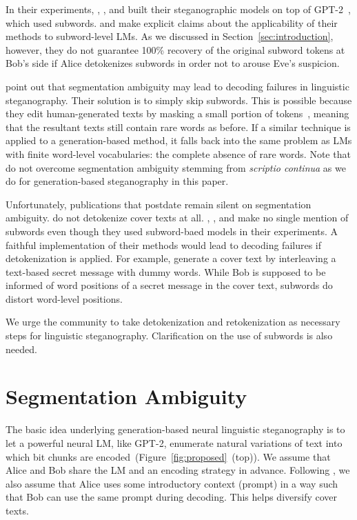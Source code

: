 \documentclass[11pt]{article}
\begin{document}
In their experiments, \citet{dai-cai-2019-towards}, \citet{ziegler-etal-2019-neural}, and \citet{shen-etal-2020-near} built their steganographic models on top of GPT-2~\citep{radford2019language}, which used subwords.
\citet{dai-cai-2019-towards} and \citet{shen-etal-2020-near} make explicit claims about the applicability of their methods to subword-level LMs.
As we discussed in Section~\ref{sec:introduction}, however, they do not guarantee 100\% recovery of the original subword tokens at Bob's side if Alice detokenizes subwords in order not to arouse Eve's suspicion.


\citet{ueoka-etal-2021-frustratingly} point out that segmentation ambiguity may lead to decoding failures in linguistic steganography.
Their solution is to simply skip subwords.
This is possible because they edit human-generated texts by masking a small portion of tokens~\citep{devlin-etal-2019-bert}, meaning that the resultant texts still contain rare words as before.
If a similar technique is applied to a generation-based method, it falls back into the same problem as LMs with finite word-level vocabularies: the complete absence of rare words.
Note that \citet{ueoka-etal-2021-frustratingly} do not overcome segmentation ambiguity stemming from \textit{scriptio continua} as we do for generation-based steganography in this paper.

Unfortunately, publications that postdate \citet{ueoka-etal-2021-frustratingly} remain silent on segmentation ambiguity.
\citet{Yang:arXiv2202.03795} do not detokenize cover texts at all.
\citet{Yi:SPL2022}, \citet{zheng2022autoregressive}, and \citet{Cao:TCSS2022} make no single mention of subwords even though they used subword-baed models in their experiments.
A faithful
implementation of their methods would lead to decoding failures if detokenization is applied.
For example, \citet{Yi:SPL2022} generate a cover text by interleaving a text-based secret message with dummy words.
While Bob is supposed to be informed of word positions of a secret message in the cover text, subwords do distort word-level positions.


We urge the community to take detokenization and retokenization as necessary steps for linguistic steganography.
Clarification on the use of subwords is also needed.


\section{Segmentation Ambiguity} \label{sec:segmentation-ambiguity}
The basic idea underlying generation-based neural linguistic steganography is to let a powerful neural LM, like GPT-2, enumerate natural variations of text into which bit chunks are encoded~(Figure~\ref{fig:proposed}~(top)).
We assume that Alice and Bob share the LM and an encoding strategy in advance.
Following \citet{ziegler-etal-2019-neural}, we also assume that Alice uses some introductory context (prompt) in a way such that Bob can use the same prompt during decoding.
This helps diversify cover texts.
\end{document}
